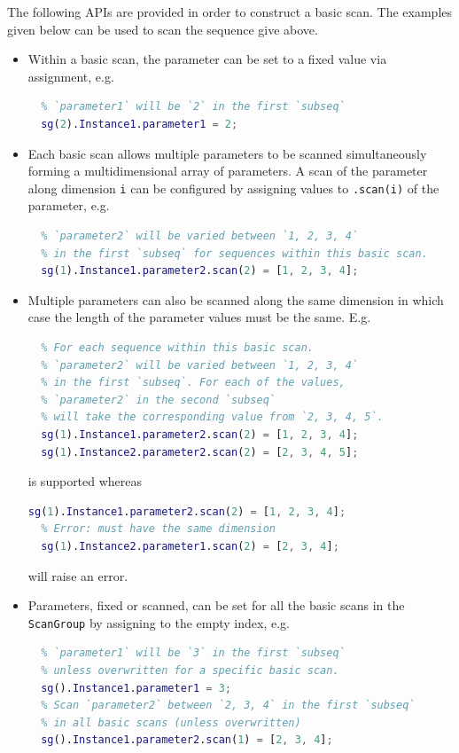 The following APIs are provided in order to construct a basic scan.
The examples given below can be used to scan the sequence give above.
\begin{itemize}
\item Within a basic scan,
  the parameter can be set to a fixed value via assignment, e.g.
  \begin{lstlisting}[language=Matlab]
  % Within the second basic scan,
  % `parameter1` will be `2` in the first `subseq`
  sg(2).Instance1.parameter1 = 2;
\end{lstlisting}
\item Each basic scan allows multiple parameters to be scanned simultaneously
  forming a multidimensional array of parameters.
  A scan of the parameter along dimension \lstinline{i} can be configured
  by assigning values to \lstinline{.scan(i)} of the parameter, e.g.
  \begin{lstlisting}[language=Matlab]
  % Scan along the second dimention within the first basic scan
  % `parameter2` will be varied between `1, 2, 3, 4`
  % in the first `subseq` for sequences within this basic scan.
  sg(1).Instance1.parameter2.scan(2) = [1, 2, 3, 4];
\end{lstlisting}
\item Multiple parameters can also be scanned along the same dimension
  in which case the length of the parameter values must be the same. E.g.
  \begin{lstlisting}[language=Matlab]
  % Scan along the second dimention within the first basic scan
  % For each sequence within this basic scan.
  % `parameter2` will be varied between `1, 2, 3, 4`
  % in the first `subseq`. For each of the values,
  % `parameter2` in the second `subseq`
  % will take the corresponding value from `2, 3, 4, 5`.
  sg(1).Instance1.parameter2.scan(2) = [1, 2, 3, 4];
  sg(1).Instance2.parameter2.scan(2) = [2, 3, 4, 5];
\end{lstlisting}
  is supported whereas
  \begin{lstlisting}[language=Matlab]
  sg(1).Instance1.parameter2.scan(2) = [1, 2, 3, 4];
  % Error: must have the same dimension
  sg(1).Instance2.parameter1.scan(2) = [2, 3, 4];
\end{lstlisting}
  will raise an error.
\item Parameters, fixed or scanned,
  can be set for all the basic scans in the \lstinline{ScanGroup}
  by assigning to the empty index, e.g.
  \begin{lstlisting}[language=Matlab]
  % For all sequences within scan,
  % `parameter1` will be `3` in the first `subseq`
  % unless overwritten for a specific basic scan.
  sg().Instance1.parameter1 = 3;
  % Scan `parameter2` between `2, 3, 4` in the first `subseq`
  % in all basic scans (unless overwritten)
  sg().Instance1.parameter2.scan(1) = [2, 3, 4];
\end{lstlisting}
\end{itemize}

